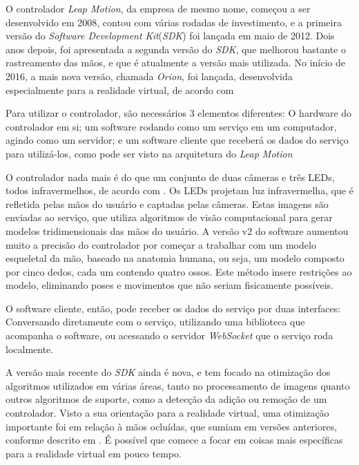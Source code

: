 O controlador \textit{Leap Motion}, da empresa de mesmo nome, começou a ser desenvolvido 
em 2008, contou com várias rodadas de investimento, e a primeira versão do 
\textit{Software Development Kit}(\textit{SDK}) foi lançada em maio de 2012. Dois anos depois, foi 
apresentada a segunda versão do \textit{SDK}, que melhorou bastante o rastreamento das 
mãos, e que é atualmente a versão mais utilizada. No início de 2016, a mais 
nova versão, chamada \textit{Orion}, foi lançada, desenvolvida especialmente para a 
realidade virtual, de acordo com \cite{leap:2016:changeset}

Para utilizar o controlador, são necessários 3 elementos diferentes: O hardware 
do controlador em si; um software rodando como um serviço em um computador, agindo como um servidor; 
e um software cliente que receberá os dados do serviço para utilizá-los, 
como pode ser visto na arquitetura do \textit{Leap Motion} \cite{leap:2016:architecture}

O controlador nada mais é do que um conjunto de duas câmeras e três LEDs, todos 
infravermelhos, de acordo com \cite{leap:2016:how-it-works}. Os LEDs projetam
luz infravermelha, que é refletida pelas mãos do usuário e captadas 
pelas câmeras. Estas imagens são enviadas ao serviço, 
que utiliza algoritmos de visão computacional para gerar modelos tridimensionais 
das mãos do usuário. A versão v2 do software aumentou muito a precisão do 
controlador por começar a trabalhar com um modelo esqueletal da mão, baseado 
na anatomia humana, ou seja, um modelo composto por cinco dedos, cada um contendo 
quatro ossos. Este método insere restrições ao modelo, eliminando poses e movimentos 
que não seriam fisicamente possíveis.

O software cliente, então, pode receber os dados do serviço por duas interfaces:
Conversando diretamente com o serviço, utilizando uma biblioteca que acompanha o software, 
ou acessando o servidor \textit{WebSocket} que o serviço roda localmente.

A versão mais recente do \textit{SDK} ainda é nova, e tem focado na otimização dos 
algoritmos utilizados em várias áreas, tanto no processamento de imagens quanto 
outros algoritmos de suporte, como a detecção da adição ou remoção de um 
controlador. Visto a sua orientação para a realidade virtual, uma otimização 
importante foi em relação à mãos ocluídas, que sumiam em versões anteriores, 
conforme descrito em \cite{leap:2016:changeset}. É possível que comece a focar 
em coisas mais específicas para a realidade virtual em pouco tempo.

